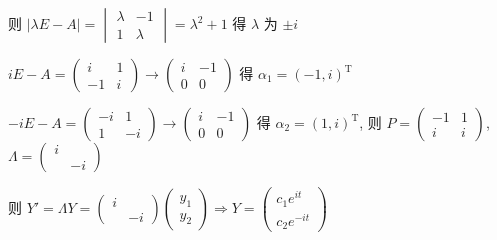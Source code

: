 \begin{enumerate}
                   则 \( |\lambda E - A| = \begin{vmatrix}
                       \lambda & -1      \\
                       1       & \lambda
                   \end{vmatrix} = \lambda^{2} + 1 \) 得 \(\lambda\) 为 \( \pm i \)

                   \( iE - A = \begin{pmatrix}
                       i  & 1 \\
                       -1 & i
                   \end{pmatrix} \rightarrow \begin{pmatrix}
                       i & -1 \\
                       0 & 0
                   \end{pmatrix} \) 得 \( \alpha_{1} = (-1, i)^{\mathrm{T}} \)

                   \( -iE - A = \begin{pmatrix}
                       -i & 1  \\
                       1  & -i
                   \end{pmatrix} \rightarrow \begin{pmatrix}
                       i & -1 \\
                       0 & 0
                   \end{pmatrix} \) 得 \( \alpha_{2} = (1, i)^{\mathrm{T}} \), 则 \( P = \begin{pmatrix}
                       -1 & 1 \\
                       i  & i
                   \end{pmatrix} \), \( \Lambda = \begin{pmatrix}
                       i &    \\
                         & -i
                   \end{pmatrix} \)

                   则 \( Y' = \Lambda Y = \begin{pmatrix}
                       i &    \\
                         & -i
                   \end{pmatrix}\begin{pmatrix}
                       y_{1} \\
                       y_{2}
                   \end{pmatrix} \Rightarrow Y = \begin{pmatrix}
                       c_{1}e^{it} \\
                       c_{2}e^{-it}
                   \end{pmatrix} \)


\end{enumerate}
